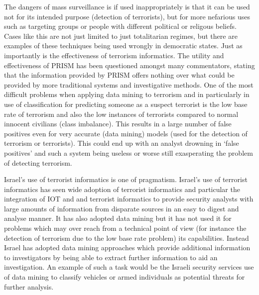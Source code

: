 The dangers of mass surveillance is if used inappropriately is that it can be used not for its intended purpose (detection of terrorists), but for more nefarious uses such as targeting groups or people with different political or religous beliefs.  Cases like this are not just limited to just totalitarian regimes, but there are examples of these techniques being used wrongly in democratic states. Just as importantly is the effectiveness of terrorism informatics. The utility and effectiveness of PRISM has been questioned amongst many commentators, stating that the information provided by PRISM offers nothing over what could be provided by more traditional systems and investigative methods. One of the most difficult problems when applying data mining to terrorism and in particularly in use of classification for predicting someone as a suspect terrorist is the low base rate of terrorism and also the low instances of terrorists compared to normal innocent civilians (class imbalance). This results in a large number of false positives even for very accurate (data mining) models (used for the detection of terrorism or terrorists). This could end up with an analyst drowning in ‘false positives’ and such a system being useless or worse still exasperating the problem of detecting terrorism.  

Israel’s use of terrorist informatics is one of pragmatism. Israel’s use of terrorist informatics has seen wide adoption of terrorist informatics and particular the integration of IOT and and terrorist informatics to provide security analysts with large amounts of information from disparate sources in an easy to digest and analyse manner. It has also adopted data mining but it has not used it for problems which may over reach from a technical point of view (for instance the detection of terrorism due to the low base rate problem) its capabilities. Instead Israel has adopted data mining approaches which provide additional information to investigators by being able to extract further information to aid an investigation. An example of such a task would be the Israeli security services use of data mining to classify vehicles or armed individuals as potential threats for further analysis.

